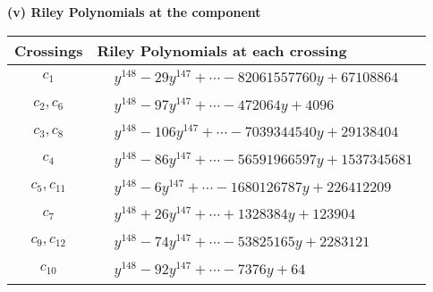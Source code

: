 \documentclass[1p]{elsarticle_modified}
\theoremstyle{definition}
\begin{document}
\newpage\renewcommand{\arraystretch}{1}
\flushleft \textbf{(v) Riley Polynomials at the component}\newline \\
\begin{tabular}{m{50pt}|m{274pt}}
Crossings & \hspace{64pt}Riley Polynomials at each crossing \\
\hline $$\begin{aligned}c_{1}\end{aligned}$$&$\begin{aligned}
&y^{148}-29 y^{147}+\cdots-82061557760 y+67108864
\end{aligned}$\\
\hline $$\begin{aligned}c_{2},c_{6}\end{aligned}$$&$\begin{aligned}
&y^{148}-97 y^{147}+\cdots-472064 y+4096
\end{aligned}$\\
\hline $$\begin{aligned}c_{3},c_{8}\end{aligned}$$&$\begin{aligned}
&y^{148}-106 y^{147}+\cdots-7039344540 y+29138404
\end{aligned}$\\
\hline $$\begin{aligned}c_{4}\end{aligned}$$&$\begin{aligned}
&y^{148}-86 y^{147}+\cdots-56591966597 y+1537345681
\end{aligned}$\\
\hline $$\begin{aligned}c_{5},c_{11}\end{aligned}$$&$\begin{aligned}
&y^{148}-6 y^{147}+\cdots-1680126787 y+226412209
\end{aligned}$\\
\hline $$\begin{aligned}c_{7}\end{aligned}$$&$\begin{aligned}
&y^{148}+26 y^{147}+\cdots+1328384 y+123904
\end{aligned}$\\
\hline $$\begin{aligned}c_{9},c_{12}\end{aligned}$$&$\begin{aligned}
&y^{148}-74 y^{147}+\cdots-53825165 y+2283121
\end{aligned}$\\
\hline $$\begin{aligned}c_{10}\end{aligned}$$&$\begin{aligned}
&y^{148}-92 y^{147}+\cdots-7376 y+64
\end{aligned}$\\
\hline
\end{tabular}\\~\\
\end{document}
